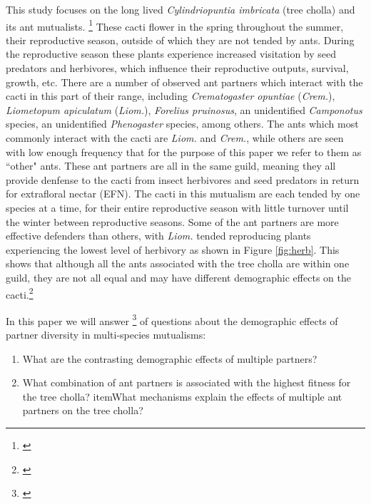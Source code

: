 \documentclass[12pt,a4paper]{article}
\newcommand{\tom}[2]{{\color{red}{#1}}\footnote{\textit{\color{red}{#2}}}}
\begin{document}
This study focuses on the long lived \textit{Cylindriopuntia imbricata} (tree cholla) and its ant mutualists. 
\tom{Tree cholla have a range which extends across the Southwest United States into Northern Mexico, with our study area set in New Mexico, US at the Sevilleta LTER.}{Like much of this paragraph, this information is more appropriate for the Study System section of the methods. I am not flagging all of that here, but note that much of this paragraph should change.}
These cacti flower in the spring throughout the summer, their reproductive season, outside of which they are not tended by ants. 
During the reproductive season these plants experience increased visitation by seed predators and herbivores, which influence their reproductive outputs, survival, growth, etc.
There are a number of observed ant partners which interact with the cacti in this part of their range, including \textit{Crematogaster opuntiae} (\textit{Crem.}), \textit{Liometopum apiculatum} (\textit{Liom.}), \textit{Forelius pruinosus}, an unidentified \textit{Camponotus} species, an unidentified \textit{Phenogaster} species, among others. 
The ants which most commonly interact with the cacti are \textit{Liom.} and \textit{Crem.}, while others are seen with low enough frequency that for the purpose of this paper we refer to them as ``other" ants. 
These ant partners are all in the same guild, meaning they all provide denfense to the cacti from insect herbivores and seed predators in return for extrafloral nectar (EFN).
The cacti in this mutualism are each tended by one species at a time, for their entire reproductive season with little turnover until the winter between reproductive seasons. 
Some of the ant partners are more effective defenders than others, with \textit{Liom.} tended reproducing plants experiencing the lowest level of herbivory as shown in Figure \ref{fig:herb}.
This shows that although all the ants associated with the tree cholla are within one guild, they are not all equal and may have different demographic effects on the cacti.\tom{}{This paragraph is a little chaotic. There is natural history info, methods, and results! Needs to be tightened up. What do you notice in other papers that you read about how study systems are first described? This should help guide your writing.}

In this paper we will answer \tom{a number}{WHat is the number?} of questions about the demographic effects of partner diversity in multi-species mutualisms:
\begin{enumerate}
  \item{What are the contrasting demographic effects of multiple partners?}
  \item{What combination of ant partners is associated with the highest fitness for the tree cholla?}
  item{What mechanisms explain the effects of multiple ant partners on the tree cholla?}
\end{enumerate}
\end{document}
